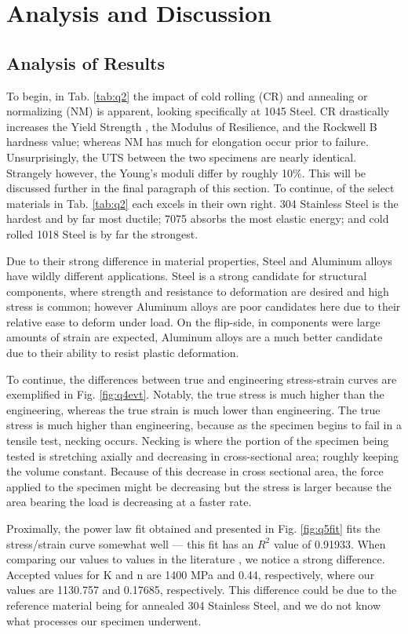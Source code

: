 \documentclass{article}
\begin{document}
\section{Analysis and Discussion}
\subsection{Analysis of Results}

To begin, in Tab. \ref{tab:q2} the impact of cold rolling (CR) and annealing or normalizing (NM) is apparent, looking specifically at 1045 Steel. CR drastically increases the Yield Strength , the Modulus of Resilience, and the Rockwell B hardness value; whereas NM has much for elongation occur prior to failure. Unsurprisingly, the UTS between the two specimens are nearly identical. Strangely however, the Young's moduli differ by roughly 10\%. This will be discussed further in the final paragraph of this section. To continue, of the select materials in Tab. \ref{tab:q2} each excels in their own right. 304 Stainless Steel is the hardest and by far most ductile; 7075 absorbs the most elastic energy; and cold rolled 1018 Steel is by far the strongest. 

Due to their strong difference in material properties, Steel and Aluminum alloys have wildly different applications. Steel is a strong candidate for structural components, where strength and resistance to deformation are desired and high stress is common; however Aluminum alloys are poor candidates here due to their relative ease to deform under load. On the flip-side, in components were large amounts of strain are expected, Aluminum alloys are a much better candidate due to their ability to resist plastic deformation. 

To continue, the differences between true and engineering stress-strain curves are exemplified in Fig. \ref{fig:q4evt}. Notably, the true stress is much higher than the engineering, whereas the true strain is much lower than engineering. The true stress is much higher than engineering, because as the specimen begins to fail in a tensile test, necking occurs. Necking is where the portion of the specimen being tested is stretching axially and decreasing in cross-sectional area; roughly keeping the volume constant. Because of this decrease in cross sectional area, the force applied to the specimen might be decreasing but the stress is larger because the area bearing the load is decreasing at a faster rate. 

Proximally, the power law fit obtained and presented in Fig. \ref{fig:q5fit} fits the stress/strain curve somewhat well --- this fit has an $R^2$ value of 0.91933. When comparing our values to values in the literature \cite{book}, we notice a strong difference. Accepted values for K and n are 1400 MPa and 0.44, respectively, where our values are 1130.757 and 0.17685, respectively. This difference could be due to the reference material being for annealed 304 Stainless Steel, and we do not know what processes our specimen underwent.
\end{document}
